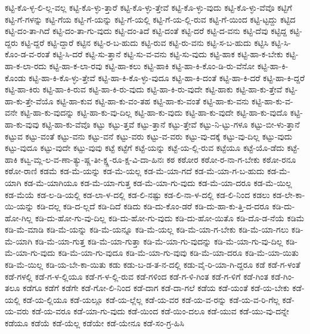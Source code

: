 {ಕಟ್ಟಿ-ಕೊ-ಳ್ಳ-ಲಿ-ಲ್ಲ-ವಲ್ಲ
ಕಟ್ಟಿ-ಕೊ-ಳ್ಳು-ತ್ತಾರೆ
ಕಟ್ಟಿ-ಕೊ-ಳ್ಳು-ತ್ತೇವೆ
ಕಟ್ಟಿ-ಕೊ-ಳ್ಳು-ವುದು
ಕಟ್ಟಿ-ಕೊ-ಳ್ಳು-ವೆವೊ
ಕಟ್ಟಿಗೆ
ಕಟ್ಟಿ-ಗೆ-ಗಳನ್ನು
ಕಟ್ಟಿ-ಗೆಯ
ಕಟ್ಟಿ-ಗೆ-ಯನ್ನು
ಕಟ್ಟಿ-ಗೆ-ಯಲ್ಲಿ
ಕಟ್ಟಿ-ಗೆ-ಯ-ಲ್ಲಿ-ರುವ
ಕಟ್ಟಿ-ಗೆ-ಯಿಂದ
ಕಟ್ಟಿ-ಟ್ಟದ್ದು
ಕಟ್ಟಿದ
ಕಟ್ಟಿ-ದಂ-ತಾ-ಗಿದೆ
ಕಟ್ಟಿ-ದಂ-ತಾ-ಗು-ವುದು
ಕಟ್ಟಿ-ದಂ-ತಿದೆ
ಕಟ್ಟಿ-ದಂತೆ
ಕಟ್ಟಿ-ದರೆ
ಕಟ್ಟಿ-ದ-ವನು
ಕಟ್ಟಿ-ದೆವು
ಕಟ್ಟಿದ್ದ
ಕಟ್ಟಿ-ದ್ದರು
ಕಟ್ಟಿ-ದ್ದರೆ
ಕಟ್ಟಿ-ದ್ದಾರೆ
ಕಟ್ಟಿನ
ಕಟ್ಟಿ-ರ-ಬ-ಹುದು
ಕಟ್ಟಿ-ರುವ
ಕಟ್ಟಿ-ರು-ವನು
ಕಟ್ಟಿ-ಸ-ಬ-ಹುದು
ಕಟ್ಟಿಸಿ
ಕಟ್ಟಿ-ಸಿ-ಕೊಂ-ಡ-ವ-ರಂತೆ
ಕಟ್ಟಿ-ಸಿ-ದರೆ
ಕಟ್ಟಿ-ಸು-ತ್ತಾನೆ
ಕಟ್ಟಿ-ಸು-ವ-ವನು
ಕಟ್ಟಿ-ಸು-ವುದು
ಕಟ್ಟಿ-ಹಾಕ
ಕಟ್ಟಿ-ಹಾ-ಕ-ಬೇಕು
ಕಟ್ಟಿ-ಹಾ-ಕ-ಲಾ-ರದು
ಕಟ್ಟಿ-ಹಾ-ಕ-ಲಾ-ರವು
ಕಟ್ಟಿ-ಹಾ-ಕಲು
ಕಟ್ಟಿ-ಹಾಕಿ
ಕಟ್ಟಿ-ಹಾ-ಕಿ-ಕೊಂ-ಡಿ-ರು-ವೆನೋ
ಕಟ್ಟಿ-ಹಾ-ಕಿ-ಕೊಂಡು
ಕಟ್ಟಿ-ಹಾ-ಕಿ-ಕೊ-ಳ್ಳು-ತ್ತೇವೆ
ಕಟ್ಟಿ-ಹಾ-ಕಿ-ಕೊ-ಳ್ಳು-ವುದೂ
ಕಟ್ಟಿ-ಹಾ-ಕಿ-ದಂತೆ
ಕಟ್ಟಿ-ಹಾ-ಕಿ-ದರೆ
ಕಟ್ಟಿ-ಹಾ-ಕಿ-ದ್ದರೆ
ಕಟ್ಟಿ-ಹಾ-ಕಿರು
ಕಟ್ಟಿ-ಹಾ-ಕಿ-ರುವ
ಕಟ್ಟಿ-ಹಾ-ಕಿ-ರು-ವುದು
ಕಟ್ಟಿ-ಹಾ-ಕಿ-ರು-ವುದೇ
ಕಟ್ಟಿ-ಹಾಕು
ಕಟ್ಟಿ-ಹಾ-ಕು-ತ್ತೇವೆ
ಕಟ್ಟಿ-ಹಾ-ಕು-ತ್ತೇ-ವೆಯೊ
ಕಟ್ಟಿ-ಹಾ-ಕುವ
ಕಟ್ಟಿ-ಹಾ-ಕು-ವಂ-ತಹ
ಕಟ್ಟಿ-ಹಾ-ಕು-ವಂತೆ
ಕಟ್ಟಿ-ಹಾ-ಕು-ವನು
ಕಟ್ಟಿ-ಹಾ-ಕು-ವ-ವನೇ
ಕಟ್ಟಿ-ಹಾ-ಕು-ವುದನ್ನು
ಕಟ್ಟಿ-ಹಾ-ಕು-ವು-ದಿಲ್ಲ
ಕಟ್ಟಿ-ಹಾ-ಕು-ವುದು
ಕಟ್ಟಿ-ಹಾ-ಕು-ವುದೇ
ಕಟ್ಟಿ-ಹಾ-ಕು-ವುದೊ
ಕಟ್ಟಿ-ಹಾ-ಕು-ವುವು
ಕಟ್ಟಿ-ಹಾ-ಕು-ವೆವೊ
ಕಟ್ಟು
ಕಟ್ಟು-ತ್ತವೆ
ಕಟ್ಟು-ತ್ತಾನೆ
ಕಟ್ಟು-ತ್ತೇವೆ
ಕಟ್ಟು-ನಿ-ಟ್ಟು-ಗಳೂ
ಕಟ್ಟು-ಬೀ-ಳು-ತ್ತಾನೆ
ಕಟ್ಟುವ
ಕಟ್ಟು-ವಂತೆ
ಕಟ್ಟು-ವನು
ಕಟ್ಟು-ವನೆ
ಕಟ್ಟು-ವರು
ಕಟ್ಟು-ವ-ವರು
ಕಟ್ಟು-ವು-ದಕ್ಕೆ
ಕಟ್ಟು-ವು-ದಿಲ್ಲ
ಕಟ್ಟು-ವುದು
ಕಟ್ಟು-ವುದೂ
ಕಟ್ಟು-ವುದೇ
ಕಟ್ಟು-ವುವು
ಕಟ್ಟೆ
ಕಟ್ಟೆಗೆ
ಕಟ್ಟೆ-ಯನ್ನು
ಕಟ್ಟೆ-ಯ-ಲ್ಲಿ-ರುವ
ಕಟ್ಟೆಯೂ
ಕಟ್ಟೆ-ಯೊ-ಡೆದು
ಕಟ್ಟೆ-ಹಾಕಿ
ಕಟ್ವ-ಮ್ಲ-ಲ-ವ-ಣಾ-ತ್ಯು-ಷ್ಣ-ತೀ-ಕ್ಷ್ಣ-ರೂ-ಕ್ಷ-ವಿ-ದಾ-ಹಿನಃ
ಕಠ
ಕಠೋರ
ಕಠೋ-ರ-ನಾ-ಗ-ಬೇಕು
ಕಠೋ-ರನೂ
ಕಠೋ-ರಾಣಿ
ಕಡಮೆ
ಕಡ-ಮೆ-ಯನ್ನು
ಕಡ-ಮೆ-ಯಲ್ಲ
ಕಡ-ಮೆ-ಯಾ-ಗದೆ
ಕಡ-ಮೆ-ಯಾ-ಗ-ಬ-ಹುದು
ಕಡ-ಮೆ-ಯಾಗಿ
ಕಡ-ಮೆ-ಯಾಗಿಯೂ
ಕಡ-ಮೆ-ಯಾ-ಗುತ್ತ
ಕಡ-ಮೆ-ಯಾ-ಗು-ವುದು
ಕಡ-ಮೆ-ಯಾ-ದರೂ
ಕಡ-ಮೆ-ಯಿಲ್ಲ
ಕಡ-ಮೆಯೆ
ಕಡ-ಲ-ಡಿ-ಯಲ್ಲಿ
ಕಡ-ಲಾ-ಳ-ದಲ್ಲಿ
ಕಡ-ಲಿ-ನಷ್ಟು
ಕಡ-ಲಿ-ನಾ-ಳ-ದಲ್ಲಿ
ಕಡ-ಲಿ-ನಿಂದ
ಕಡಲು
ಕಡ-ಲೇ-ಕಾ-ಯಿ-ಯನ್ನು
ಕಡಿ-ದಲ್ಲ
ಕಡಿ-ದ-ಲ್ಲದೆ
ಕಡಿ-ದಿದೆ
ಕಡಿದು
ಕಡಿ-ದು-ಕೊಂ-ಡರೆ
ಕಡಿ-ದು-ಹಾ-ಕು-ತ್ತಿ-ದ-ದರೂ
ಕಡಿ-ದು-ಹೋ-ಗಿಲ್ಲ
ಕಡಿ-ದು-ಹೋ-ಗು-ವು-ದಿಲ್ಲ
ಕಡಿ-ದು-ಹೋ-ಗು-ವುದು
ಕಡಿ-ದು-ಹೋ-ಯಿತೊ
ಕಡಿ-ದೊ-ಡ-ನೆಯೆ
ಕಡಿಮೆ
ಕಡಿ-ಮೆ-ಮಾಡಿ
ಕಡಿ-ಮೆ-ಯನ್ನು
ಕಡಿ-ಮೆ-ಯನ್ನೂ
ಕಡಿ-ಮೆ-ಯಲ್ಲ
ಕಡಿ-ಮೆ-ಯಾ-ಗ-ಬೇಕು
ಕಡಿ-ಮೆ-ಯಾ-ಗಲು
ಕಡಿ-ಮೆ-ಯಾಗಿ
ಕಡಿ-ಮೆ-ಯಾ-ಗುತ್ತ
ಕಡಿ-ಮೆ-ಯಾ-ಗುತ್ತಾ
ಕಡಿ-ಮೆ-ಯಾ-ಗು-ವುದನ್ನು
ಕಡಿ-ಮೆ-ಯಾ-ಗು-ವು-ದಿಲ್ಲ
ಕಡಿ-ಮೆ-ಯಾ-ಗು-ವುದು
ಕಡಿ-ಮೆ-ಯಾ-ಗು-ವುದೂ
ಕಡಿ-ಮೆ-ಯಾ-ಗು-ವುವು
ಕಡಿ-ಮೆ-ಯಾ-ದರೂ
ಕಡಿ-ಮೆ-ಯಾ-ಯಿತು
ಕಡಿ-ಮೆ-ಯಿಲ್ಲ
ಕಡಿ-ಯ-ಬೇ-ಕಾ-ಯಿತು
ಕಡು
ಕಡು-ಬ-ಡ-ತ-ನ-ದಲ್ಲಿ
ಕಡು-ವೈ-ರಿ-ಯಾ-ಗಿ-ದ್ದರೂ
ಕಡೆ
ಕಡೆ-ಗ-ಳಂತೆ
ಕಡೆ-ಗಳಲ್ಲಿ
ಕಡೆ-ಗ-ಳ-ಲ್ಲಿಯೂ
ಕಡೆ-ಗ-ಳ-ಲ್ಲಿ-ರುವ
ಕಡೆ-ಗಳಿಂದ
ಕಡೆ-ಗ-ಳಿ-ಗಿಂತ
ಕಡೆ-ಗ-ಳಿಗೆ
ಕಡೆ-ಗಿಂತ
ಕಡೆ-ಗಿಂ-ತಲೂ
ಕಡೆಗೂ
ಕಡೆಗೆ
ಕಡೆಗೇ
ಕಡೆ-ಗೋ-ಲಿ-ನಿಂದ
ಕಡೆ-ದಾಗ
ಕಡೆ-ದಾ-ಗಲೆ
ಕಡೆಯ
ಕಡೆ-ಯಂತೆ
ಕಡೆ-ಯ-ಬೇಕು
ಕಡೆ-ಯಲ್ಲಿ
ಕಡೆ-ಯ-ಲ್ಲಿಯೂ
ಕಡೆ-ಯಲ್ಲೂ
ಕಡೆ-ಯ-ಲ್ಲೆಲ್ಲ
ಕಡೆ-ಯ-ವರ
ಕಡೆ-ಯ-ವ-ರನ್ನು
ಕಡೆ-ಯ-ವ-ರಿ-ಗೆಲ್ಲ
ಕಡೆ-ಯ-ವರು
ಕಡೆ-ಯ-ವರೂ
ಕಡೆ-ಯಾ-ಗು-ವುದು
ಕಡೆ-ಯಿಂದ
ಕಡೆ-ಯಿಂ-ದಲೂ
ಕಡೆ-ಯುವ
ಕಡೆ-ಯು-ವು-ದನ್ನೇ
ಕಡೆಯೂ
ಕಡೆಯೆ
ಕಡೆ-ಯೆಲ್ಲ
ಕಡೆಯೇ
ಕಡೆ-ಯೇನೂ
ಕಡೆ-ಸಂ-ಗ್ರ-ಹಿಸಿ
}
